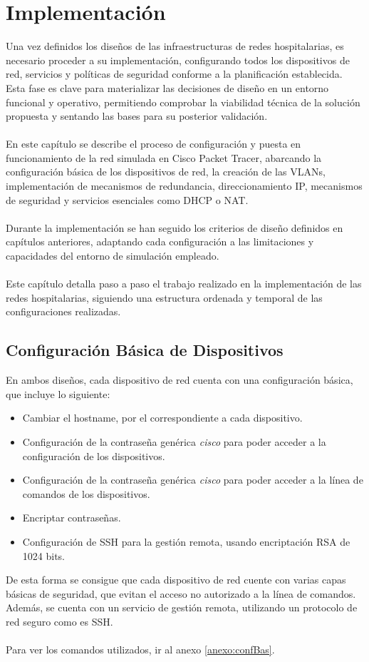 
\chapter{Implementación}\label{Implementación}
Una vez definidos los diseños de las infraestructuras de redes hospitalarias, es necesario proceder a su implementación, configurando todos los dispositivos de red, servicios y políticas de seguridad conforme a la planificación establecida. Esta fase es clave para materializar las decisiones de diseño en un entorno funcional y operativo, permitiendo comprobar la viabilidad técnica de la solución propuesta y sentando las bases para su posterior validación.
\\ \\
En este capítulo se describe el proceso de configuración y puesta en funcionamiento de la red simulada en Cisco Packet Tracer, abarcando la configuración básica de los dispositivos de red, la creación de las VLANs, implementación de mecanismos de redundancia, direccionamiento IP, mecanismos de seguridad y servicios esenciales como DHCP o NAT.
\\ \\
Durante la implementación se han seguido los criterios de diseño definidos en capítulos anteriores, adaptando cada configuración a las limitaciones y capacidades del entorno de simulación empleado.
\\ \\
Este capítulo detalla paso a paso el trabajo realizado en la implementación de las redes hospitalarias, siguiendo una estructura ordenada y temporal de las configuraciones realizadas.

\section{Configuración Básica de Dispositivos}
En ambos diseños, cada dispositivo de red cuenta con una configuración básica, que incluye lo siguiente:
\begin{itemize}
    \item Cambiar el hostname, por el correspondiente a cada dispositivo.
    \item Configuración de la contraseña genérica \textit{cisco} para poder acceder a la configuración de los dispositivos.
    \item Configuración de la contraseña genérica \textit{cisco} para poder acceder a la línea de comandos de los dispositivos.
    \item Encriptar contraseñas.
    \item Configuración de SSH para la gestión remota, usando encriptación RSA de 1024 bits.
\end{itemize}
De esta forma se consigue que cada dispositivo de red cuente con varias capas básicas de seguridad, que evitan el acceso no autorizado a la línea de comandos. Además, se cuenta con un servicio de gestión remota, utilizando un protocolo de red seguro como es SSH.
\\ \\
Para ver los comandos utilizados, ir al anexo \ref{anexo:confBas}.

